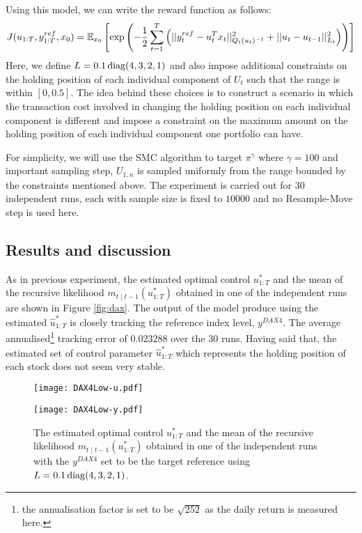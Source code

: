 Using this model, we can write the reward function as follows:
\begin{equation}
  J(u_{1:T},y^{ref}_{1:T}, x_0) = \operatorname{\mathbb{E}}_{x_0}\left[ \exp \left( -\dfrac{1}{2}\displaystyle\sum^T_{t=1}\left(\vert\vert y^{ref}_t - u^T_tx_t \vert\vert^2_{Q_t(u_t)^{-1}}  + \vert\vert u_t - u_{t-1} \vert\vert^2_{L_t}\right) \right ) \right]
\end{equation}
Here, we define $L = 0.1\operatorname{diag}(4,3,2,1)$  and also impose additional constraints on the holding position of each individual component of $U_t$ such that the range is within $[0,0.5]$. The idea behind these choices is to construct a scenario in which the transaction cost involved in changing the holding position on each individual component is different and impose a constraint on the maximum amount on the holding position of each individual component one portfolio can have.

For simplicity, we will use the SMC algorithm to target $\pi^\gamma$ where $\gamma=100$ and important sampling step, $U_{1,n}$ is sampled uniformly from the range bounded by the constraints mentioned above. The experiment is carried out for $30$ independent runs, each with sample size is fixed to $10000$ and no Resample-Move step is used here.

\subsection{Results and discussion}
As in previous experiment, the estimated optimal control $u^*_{1:T}$ and the mean of the recursive likelihood $m_{t \mid t-1}(u^*_{1:T})$ obtained in one of the independent runs are shown in Figure \ref{fig:dax}.  The output of the model produce using the estimated $\hat{u}^*_{1:T}$ is closely tracking the reference index level, $y^{DAX4}$. The average annualised\footnote{the annualisation factor is set to be $\sqrt{252}$ as the daily return is measured here.} tracking error of $0.023288$ over the $30$ runs. Having said that, the estimated set of control parameter $\hat{u}^*_{1:T}$ which represents the holding position of each stock does not seem very stable.

\begin{figure}[tbp]
\centering
    \begin{minipage}{0.5\textwidth}
        \centering
        \texttt{[image: DAX4Low-u.pdf]}
    \end{minipage}%
    \begin{minipage}{0.5\textwidth}
        \centering
        \texttt{[image: DAX4Low-y.pdf]}
    \end{minipage}
\caption{The estimated optimal control $u^*_{1:T}$ and the mean of the recursive likelihood $m_{t \mid t-1}(u^*_{1:T})$ obtained in one of the independent runs with the $y^{DAX4}$ set to be the target reference using $L = 0.1\operatorname{diag}(4,3,2,1)$.}
\label{fig:dax4}
\end{figure}

